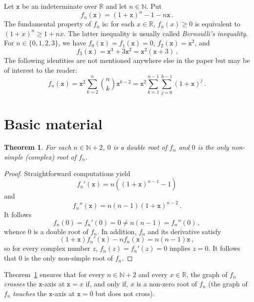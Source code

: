 \documentclass[12pt]{article}
\newcommand{\bR}{\mathbb{R}}
\newcommand{\bN}{\mathbb{N}}
\newcommand{\ttx}{\mathtt{x}}
\newtheorem{theorem}{Theorem}
\begin{document}
\sloppy

Let $\ttx$ be an indeterminate over $\bR$ and let $n \in \bN$.
Put
$$
f_n(\ttx) = {(1 + \ttx)}^n - 1 - n \ttx \, .
$$
The fundamental property of $f_n$ is:
for each $x \in \bR$, $f_n(x) \ge 0$ is equivalent to ${(1 + x)}^n \ge 1 + n x$. 
The latter inequality is usually called \emph{Bernoulli's inequality}.
For $n \in \{ 0, 1, 2, 3 \}$, we have 
$f_0(\ttx) = f_1(\ttx) = 0$,
$f_2(\ttx) = \ttx^2$, and
\begin{equation} \label{eq:f3-t3}
f_3(\ttx) = \ttx^3 + 3 \ttx^2 = \ttx^2 (\ttx + 3) \,.
\end{equation}
 The following identities are not mentioned anywhere else in the paper but may be of interest to the reader:
 $$
 f_n (\ttx)
 = \ttx^2 \sum_{k = 2}^n \binom{n}{k} \ttx^{k - 2}
 = \ttx^2 \sum_{k = 1}^{n - 1}  \sum_{j = 0}^{k - 1} {(1 + \ttx)}^j \, .  
 $$

 \section{Basic material}
 
\begin{theorem} \label{thm:root-mult}
  For each $n \in \bN + 2$,
  $0$ is a double root of $f_n$ and $0$ is the only non-simple (complex) root of $f_n$.
\end{theorem}

\begin{proof}
  Straightforward computations yield
  \begin{equation} \label{eq:deriv-fn} 
  f_n'(\ttx)  = n \left( {(1 + \ttx)}^{n - 1} -  1 \right) 
  \end{equation}
  and
  $$
  f_n''(\ttx)  = n (n - 1) {(1 + \ttx)}^{n - 2} \,.
  $$
  It follows
  $$
  f_n(0) = f_n'(0) = 0 \ne n (n - 1) = f_n''(0) \, ,
  $$
  whence $0$ is a double root of $f_n$.
  In addition, $f_n$ and its derivative satisfy 
   $$
   (1 + \ttx) f_n'(\ttx) - n f_n(\ttx) = n (n - 1) \ttx \, ,
   $$
   so for every complex number $z$, $f_n(z) = f_n'(z) = 0$ implies $z = 0$.
   It follows that $0$ is the only non-simple root of $f_n$.
 \end{proof}
 
 Theorem~\ref{thm:root-mult} ensures that
for every $n \in \bN + 2$ and every $x \in \bR$, 
the graph of $f_n$ \emph{crosses} the $\ttx$-axis at $\ttx = x$ if, and only if, $x$ is a non-zero root of $f_n$
(the graph of $f_n$ \emph{touches} the $\ttx$-axis at $\ttx = 0$ but does not cross).
\end{document}
